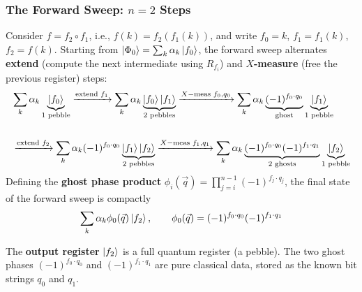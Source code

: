 \subsubsection{The Forward Sweep: $n=2$ Steps}
Consider $f = f_2 \circ f_1$, i.e., $f(k) = f_2(f_1(k))$, and write $f_0 = k$, $f_1 = f_1(k)$, $f_2 = f(k)$. Starting from $\ket{\Phi_0} = \sum_k \alpha_k \ket{f_0}$, the forward sweep alternates \textbf{extend} (compute the next intermediate using $R_{f_i}$) and $X$\textbf{-measure} (free the previous register) steps:
\begin{align}
    &\sum_{k}\alpha_k \underbrace{\ket{f_0}}_{1 \text{ pebble}} \xrightarrow[]{\text{extend } f_1} \sum_k \alpha_k \underbrace{\ket{f_0}\ket{f_1}}_{2 \text{ pebbles}} \xrightarrow[]{X-\text{meas }f_0,q_0} \sum_k \alpha_k \underbrace{(-1)^{f_0\cdot q_0}}_{\text{ghost}}\underbrace{\ket{f_1}}_{1 \text{ pebble} } \\
    & \notag\\
    & \xrightarrow[]{\text{extend } f_2} \sum_k \alpha_k(-1)^{f_0\cdot q_0} \underbrace{\ket{f_1}\ket{f_2}}_{2 \text{ pebbles}} \xrightarrow[]{X-\text{meas }f_1,q_1} \sum_k \alpha_k \underbrace{(-1)^{f_0 \cdot q_0}(-1)^{f_1 \cdot q_1}}_{2 \text{ ghosts}} \underbrace{\ket{f_2}}_{1 \text{ pebble} }
\end{align}
Defining the \textbf{ghost phase product} $\phi_i(\vec{q}) = \prod_{j=i}^{n-1} (-1)^{f_j \cdot q_j}$, the final state of the forward sweep is compactly
\begin{equation}
    \sum_k \alpha_k \phi_0(\vec{q})\ket{f_2}, \qquad \phi_0(\vec{q}) = (-1)^{f_0\cdot q_0} (-1)^{f_1\cdot q_1}
\end{equation}
 
The \textbf{output register} $\ket{f_2}$ is a full quantum register (a pebble). The two ghost phases $(-1)^{f_0 \cdot q_0}$ and $(-1)^{f_1 \cdot q_1}$ are pure classical data, stored as the known bit strings $q_0$ and $q_1$. \\

